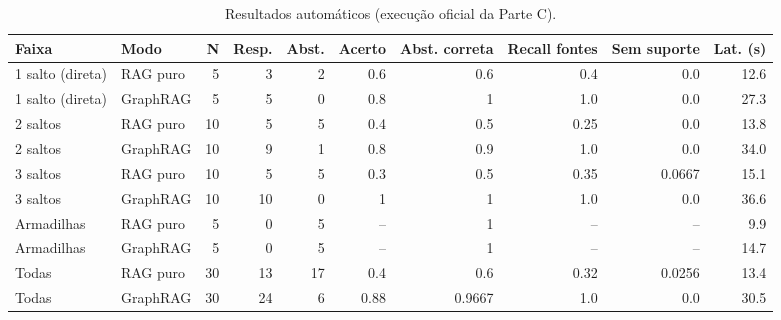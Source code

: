 \begin{table}[h]\centering\small\caption{Resultados automáticos (execução oficial da Parte C).}
\begin{tabular}{llrrrrrrrr}\toprule
Faixa & Modo & N & Resp. & Abst. & Acerto & Abst. correta & Recall fontes & Sem suporte & Lat. (s) \\\midrule
1 salto (direta) & RAG puro & 5 & 3 & 2 & 0.6 & 0.6 & 0.4 & 0.0 & 12.6 \\
1 salto (direta) & GraphRAG & 5 & 5 & 0 & 0.8 & 1 & 1.0 & 0.0 & 27.3 \\
2 saltos & RAG puro & 10 & 5 & 5 & 0.4 & 0.5 & 0.25 & 0.0 & 13.8 \\
2 saltos & GraphRAG & 10 & 9 & 1 & 0.8 & 0.9 & 1.0 & 0.0 & 34.0 \\
3 saltos & RAG puro & 10 & 5 & 5 & 0.3 & 0.5 & 0.35 & 0.0667 & 15.1 \\
3 saltos & GraphRAG & 10 & 10 & 0 & 1 & 1 & 1.0 & 0.0 & 36.6 \\
Armadilhas & RAG puro & 5 & 0 & 5 & -- & 1 & -- & -- & 9.9 \\
Armadilhas & GraphRAG & 5 & 0 & 5 & -- & 1 & -- & -- & 14.7 \\
Todas & RAG puro & 30 & 13 & 17 & 0.4 & 0.6 & 0.32 & 0.0256 & 13.4 \\
Todas & GraphRAG & 30 & 24 & 6 & 0.88 & 0.9667 & 1.0 & 0.0 & 30.5 \\
\bottomrule\end{tabular}\end{table}
